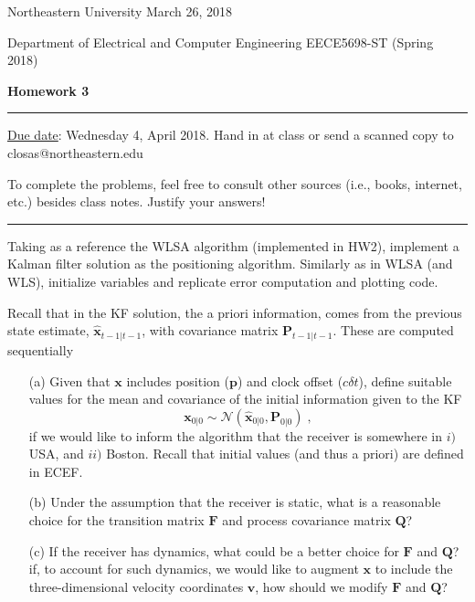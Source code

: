 \documentclass[11pt]{article}
\begin{document}
\noindent Northeastern University
\hfill March 26, 2018

\noindent Department of Electrical and Computer Engineering
\hfill EECE5698-ST (Spring 2018)

\noindent {} \hfill \textbf{Homework 3}

\noindent \rule{\linewidth}{1.5pt}

\vspace*{.5cm}

\underline{Due date}: Wednesday 4, April 2018. Hand in at class or send a scanned copy to closas@northeastern.edu

To complete the problems, feel free to consult other sources (i.e., books, internet, etc.) besides class notes.  Justify your answers!

\noindent \rule{\linewidth}{1pt}
\vspace*{1cm}


Taking as a reference the WLSA algorithm (implemented in HW2), implement a Kalman filter solution as the positioning algorithm. 
Similarly as in WLSA (and WLS), initialize variables and replicate error computation and plotting code.

Recall that in the KF solution, the a priori information, comes from the previous state estimate, $\hat{\mathbf{x}}_{t-1|t-1}$, with covariance matrix $\mathbf{P}_{t-1|t-1}$. These are computed sequentially

\begin{enumerate}
\item[(a)] Given that $\mathbf{x}$ includes position ($\mathbf{p}$) and clock offset ($c \delta t$), define suitable values for the mean and covariance of the initial information given to the KF
\begin{equation}
\nonumber \mathbf{x}_{0|0} \sim \mathcal{N}(\hat{\mathbf{x}}_{0|0},\mathbf{P}_{0|0}) \;,
\end{equation}
\noindent if we would like to inform the algorithm that the receiver is somewhere in $i)$ USA, and $ii)$ Boston. Recall that initial values (and thus a priori) are defined in ECEF.
\item[(b)] Under the assumption that the receiver is static, what is a reasonable choice for the transition matrix $\mathbf{F}$ and process covariance matrix $\mathbf{Q}$?
\item[(c)] If the receiver has dynamics, what could be a better choice for $\mathbf{F}$ and $\mathbf{Q}$? if, to account for such dynamics, we would like to augment $\mathbf{x}$ to include the three-dimensional velocity coordinates $\mathbf{v}$, how should we modify $\mathbf{F}$ and $\mathbf{Q}$?  
\end{enumerate}
\end{document}
